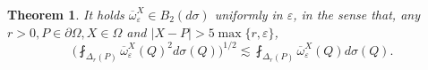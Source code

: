 \documentclass[reqno,12pt]{amsart} %
\newtheorem{theorem}{Theorem}[section]
\theoremstyle{definition}
\theoremstyle{remark}
\numberwithin{equation}{section}
\newcommand{\e}{\varepsilon}
\newcommand{\jz}[1]{\textcolor{red}{#1}}
\DeclareMathOperator{\dist}{dist}
\begin{document}


\begin{theorem}\label{thm.B2}
    It holds $\overline{\omega}_\e^X \in B_2(d\sigma)$ uniformly in $\e$, in the sense that, any $r > 0, P\in \partial \Omega, X \in \Omega$ and $|X-P| > 5\max \{r, \e \}$,
    \begin{equation}\label{est.B2}
        \bigg( \fint_{\Delta_r(P)} \overline{\omega}_\e^X(Q)^2 d\sigma(Q) \bigg)^{1/2} \lesssim \fint_{\Delta_{r}(P)} \overline{\omega}_\e^X(Q) d\sigma(Q).
    \end{equation}
\end{theorem}
\end{document}
